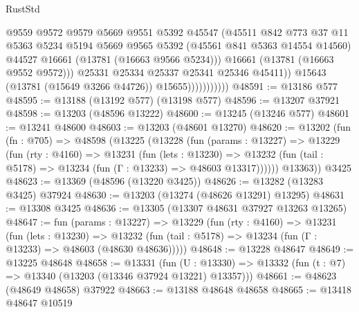 \begin{lexlean}{RustStd}
\begin{coremodule}
                                @9559
                                @9572
                                @9579
                                @5669
                                @9551
                                @5392
                                @45547
                                (@45511
                                  @842
                                  @773
                                  @37
                                  @11
                                  @5363
                                  @5234
                                  @5194
                                  @5669
                                  @9565
                                  @5392
                                  (@45561 @841 @5363 @14554 @14560)
                                  @44527
                                  @16661
                                  (@13781 (@16663 @9566 @5234)))
                                @16661
                                (@13781 (@16663 @9552 @9572)))
                              @25331
                              @25334
                              @25337
                              @25341
                              @25346
                              @45411))
                          @15643
                          (@13781 (@15649 @3266 @44726))
                          @15655)))))))))))
@48591 := @13186 @577
@48595 := @13188 (@13192 @577) (@13198 @577)
@48596 := @13207 @37921
@48598 := @13203 (@48596 @13222)
@48600 := @13245 (@13246 @577)
@48601 := @13241 @48600
@48603 := @13203 (@48601 @13270)
@48620 := @13202
    (fun (fn : @705) =>
    @48598
      (@13225
        (@13228
          (fun (params : @13227) =>
          @13229
            (fun (rty : @4160) =>
            @13231
              (fun (lets : @13230) =>
              @13232 (fun (tail : @5178) => @13234 (fun (Γ : @13233) => @48603 @13317))))))
        @13363))
    @3425
@48623 := @13369 (@48596 (@13220 @3425))
@48626 := @13282 (@13283 @3425) @37924
@48630 := @13203 (@13274 (@48626 @13291) @13295)
@48631 := @13308 @3425
@48636 := @13305 (@13307 @48631 @37927 @13263 @13265)
@48647 := fun (params : @13227) =>
  @13229
    (fun (rty : @4160) =>
    @13231
      (fun (lets : @13230) =>
      @13232 (fun (tail : @5178) => @13234 (fun (Γ : @13233) => @48603 (@48630 @48636)))))
@48648 := @13228 @48647
@48649 := @13225 @48648
@48658 := @13331
    (fun (U : @13330) => @13332 (fun (t : @7) => @13340 (@13203 (@13346 @37924 @13221) @13357)))
@48661 := @48623 (@48649 @48658) @37922
@48663 := @13188 @48648 @48658
@48665 := @13418 @48647 @10519

\end{coremodule}
\end{lexlean}

